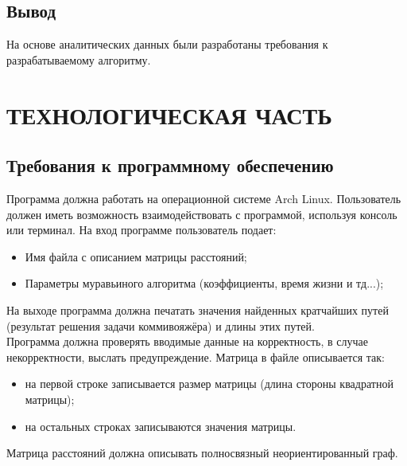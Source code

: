 \documentclass[a4paper,12pt]{article}
\begin{document}
\newpage
\subsection{Вывод}
На основе аналитических данных были разработаны требования к разрабатываемому алгоритму.

\newpage
\section{ТЕХНОЛОГИЧЕСКАЯ ЧАСТЬ}
\subsection{Требования к программному обеспечению}
Программа должна работать на операционной системе Arch Linux. Пользователь должен иметь возможность взаимодействовать с программой, используя консоль или терминал. На вход программе пользователь подает:
\begin{itemize}
\item Имя файла с описанием матрицы расстояний;
\item Параметры муравьиного алгоритма (коэффициенты, время жизни и тд...);
\end{itemize}
На выходе программа должна печатать значения найденных кратчайших путей (результат решения задачи коммивояжёра) и длины этих путей.\\
Программа должна проверять вводимые данные на корректность, в случае некорректности, выслать предупреждение.
Матрица в файле описывается так:
\begin{itemize}
\item на первой строке записывается размер матрицы (длина стороны квадратной матрицы);
\item на остальных строках записываются значения матрицы.
\end{itemize}
Матрица расстояний должна описывать полносвязный неориентированный граф.

\newpage
\end{document}
